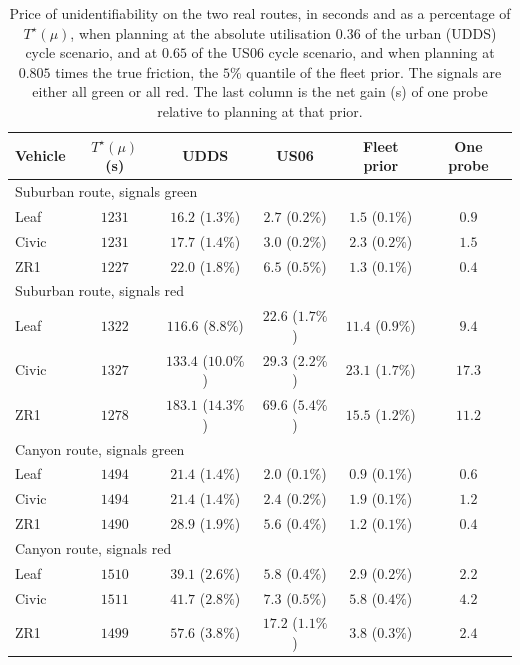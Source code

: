 \begin{table}[htbp]
\centering\small
\caption{Price of unidentifiability on the two real routes, in seconds and as a percentage of $T^\star(\mu)$, when planning at the absolute utilisation $0.36$ of the urban (UDDS) cycle scenario, and at $0.65$ of the US06 cycle scenario, and when planning at $0.805$ times the true friction, the $5\%$ quantile of the fleet prior. The signals are either all green or all red. The last column is the net gain (s) of one probe relative to planning at that prior.}\label{tab:realroutes}
\begin{tabular}{lccccc}
\toprule
Vehicle & $T^\star(\mu)$ (s) & UDDS & US06 & Fleet prior & One probe\\
\midrule
\multicolumn{6}{l}{Suburban route, signals green}\\
Leaf & $1231$ & $16.2$ ($1.3\%$) & $2.7$ ($0.2\%$) & $1.5$ ($0.1\%$) & $0.9$\\
Civic & $1231$ & $17.7$ ($1.4\%$) & $3.0$ ($0.2\%$) & $2.3$ ($0.2\%$) & $1.5$\\
ZR1 & $1227$ & $22.0$ ($1.8\%$) & $6.5$ ($0.5\%$) & $1.3$ ($0.1\%$) & $0.4$\\
\midrule
\multicolumn{6}{l}{Suburban route, signals red}\\
Leaf & $1322$ & $116.6$ ($8.8\%$) & $22.6$ ($1.7\%$) & $11.4$ ($0.9\%$) & $9.4$\\
Civic & $1327$ & $133.4$ ($10.0\%$) & $29.3$ ($2.2\%$) & $23.1$ ($1.7\%$) & $17.3$\\
ZR1 & $1278$ & $183.1$ ($14.3\%$) & $69.6$ ($5.4\%$) & $15.5$ ($1.2\%$) & $11.2$\\
\midrule
\multicolumn{6}{l}{Canyon route, signals green}\\
Leaf & $1494$ & $21.4$ ($1.4\%$) & $2.0$ ($0.1\%$) & $0.9$ ($0.1\%$) & $0.6$\\
Civic & $1494$ & $21.4$ ($1.4\%$) & $2.4$ ($0.2\%$) & $1.9$ ($0.1\%$) & $1.2$\\
ZR1 & $1490$ & $28.9$ ($1.9\%$) & $5.6$ ($0.4\%$) & $1.2$ ($0.1\%$) & $0.4$\\
\midrule
\multicolumn{6}{l}{Canyon route, signals red}\\
Leaf & $1510$ & $39.1$ ($2.6\%$) & $5.8$ ($0.4\%$) & $2.9$ ($0.2\%$) & $2.2$\\
Civic & $1511$ & $41.7$ ($2.8\%$) & $7.3$ ($0.5\%$) & $5.8$ ($0.4\%$) & $4.2$\\
ZR1 & $1499$ & $57.6$ ($3.8\%$) & $17.2$ ($1.1\%$) & $3.8$ ($0.3\%$) & $2.4$\\
\bottomrule
\end{tabular}
\end{table}
